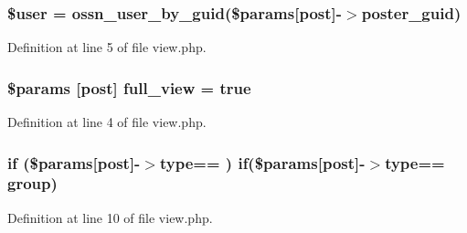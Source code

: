 \subsubsection[{\texorpdfstring{\$user}{$user}}]{\setlength{\rightskip}{0pt plus 5cm}\${\bf user} = {\bf ossn\+\_\+user\+\_\+by\+\_\+guid}(\$params\mbox{[}\textquotesingle{}post\textquotesingle{}\mbox{]}-\/$>${\bf poster\+\_\+guid})}\hypertarget{components_2_ossn_wall_2plugins_2default_2wall_2pages_2view_8php_a598ca4e71b15a1313ec95f0df1027ca5}{}\label{components_2_ossn_wall_2plugins_2default_2wall_2pages_2view_8php_a598ca4e71b15a1313ec95f0df1027ca5}


Definition at line 5 of file view.\+php.

\subsubsection[{\texorpdfstring{full\+\_\+view}{full_view}}]{\setlength{\rightskip}{0pt plus 5cm}\$params \mbox{[}\textquotesingle{}post\textquotesingle{}\mbox{]} full\+\_\+view = true}\hypertarget{components_2_ossn_wall_2plugins_2default_2wall_2pages_2view_8php_a8aa2e512060821710745c7a77b98b65f}{}\label{components_2_ossn_wall_2plugins_2default_2wall_2pages_2view_8php_a8aa2e512060821710745c7a77b98b65f}


Definition at line 4 of file view.\+php.

\subsubsection[{\texorpdfstring{if}{if}}]{\setlength{\rightskip}{0pt plus 5cm}if (\$params\mbox{[}\textquotesingle{}post\textquotesingle{}\mbox{]}-\/$>${\bf type}== \textquotesingle{}) if(\$params\mbox{[}\textquotesingle{}post\textquotesingle{}\mbox{]}-\/$>${\bf type}== \textquotesingle{}group\textquotesingle{})}\hypertarget{components_2_ossn_wall_2plugins_2default_2wall_2pages_2view_8php_a8d1c85bf219192b21592cdbaa4646be9}{}\label{components_2_ossn_wall_2plugins_2default_2wall_2pages_2view_8php_a8d1c85bf219192b21592cdbaa4646be9}


Definition at line 10 of file view.\+php.

